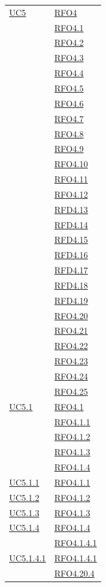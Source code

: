 \begin{longtable}{|>{\centering}m{5cm}|m{5cm}<{\centering}|}
\hyperref[UC5]{UC5} & \hyperlink{RFO4}{RFO4}\\
& \hyperlink{RFO4.1}{RFO4.1}\\
& \hyperlink{RFO4.2}{RFO4.2}\\
& \hyperlink{RFO4.3}{RFO4.3}\\
& \hyperlink{RFO4.4}{RFO4.4}\\
& \hyperlink{RFO4.5}{RFO4.5}\\
& \hyperlink{RFO4.6}{RFO4.6}\\
& \hyperlink{RFO4.7}{RFO4.7}\\
& \hyperlink{RFO4.8}{RFO4.8}\\
& \hyperlink{RFO4.9}{RFO4.9}\\
& \hyperlink{RFO4.10}{RFO4.10}\\
& \hyperlink{RFO4.11}{RFO4.11}\\
& \hyperlink{RFO4.12}{RFO4.12}\\
& \hyperlink{RFD4.13}{RFD4.13}\\
& \hyperlink{RFD4.14}{RFD4.14}\\
& \hyperlink{RFD4.15}{RFD4.15}\\
& \hyperlink{RFD4.16}{RFD4.16}\\
& \hyperlink{RFD4.17}{RFD4.17}\\

& \hyperlink{RFD4.18}{RFD4.18}\\ 
& \hyperlink{RFD4.18}{RFD4.19}\\ 
& \hyperlink{RFD4.18}{RFO4.20}\\ 
& \hyperlink{RFD4.18}{RFO4.21}\\ 
& \hyperlink{RFD4.18}{RFO4.22}\\ 
& \hyperlink{RFD4.18}{RFO4.23}\\ 
& \hyperlink{RFD4.18}{RFO4.24}\\ 
& \hyperlink{RFD4.18}{RFO4.25}\\ \hline
\hyperref[UC5.1]{UC5.1} & \hyperlink{RFO4.1}{RFO4.1}\\
& \hyperlink{RFO4.1.1}{RFO4.1.1}\\
& \hyperlink{RFO4.1.2}{RFO4.1.2}\\
& \hyperlink{RFO4.1.3}{RFO4.1.3}\\
& \hyperlink{RFO4.1.4}{RFO4.1.4}\\ \hline
\hyperref[UC5.1.1]{UC5.1.1} & \hyperlink{RFO4.1.1}{RFO4.1.1}\\ \hline
\hyperref[UC5.1.2]{UC5.1.2} & \hyperlink{RFO4.1.2}{RFO4.1.2}\\ \hline
\hyperref[UC5.1.3]{UC5.1.3} & \hyperlink{RFO4.1.3}{RFO4.1.3}\\ \hline
\hyperref[UC5.1.4]{UC5.1.4} & \hyperlink{RFO4.1.4}{RFO4.1.4}\\
& \hyperlink{RFO4.1.4.1}{RFO4.1.4.1}\\ \hline
\hyperref[UC5.1.4.1]{UC5.1.4.1} & \hyperlink{RFO4.1.4.1}{RFO4.1.4.1}\\ & \hyperlink{RFO4.20.4}{RFO4.20.4}\\ \hline


\end{longtable}
